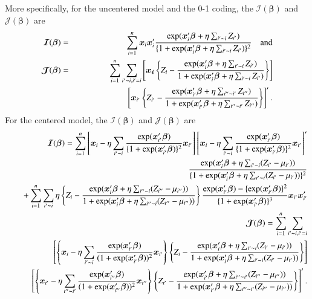 \documentclass[authoryear,review, 12pt]{elsarticle}
\begin{document}
More specifically, for the uncentered model and the 0-1 coding, the $\bm{\mathcal{I}}(\bm{\beta})$ and $\bm{\mathcal{J}}(\bm{\beta})$ are
\begin{eqnarray*}
\bm{\mathcal{I}}(\bm{\beta})&=&\sum_{i=1}^n\bm{x}_i\bm{x}_i'\frac{\exp({\bm{x}_i'\bm{\beta}+\eta\sum_{i'\thicksim i}Z_{i'}})}{\{1+\exp(\bm{x}_i'\bm{\beta}+\eta\sum_{i'\thicksim i}Z_{i'})\}^2}\quad\mbox{and} \\
\bm{\mathcal{J}}(\bm{\beta})&=&\sum_{i=1}^n\sum_{i'\thicksim i, i'=i}\left[\bm{x_i}\left\{Z_i-\frac{\exp(\bm{x}_i'\bm{\beta}+\eta\sum_{i'\thicksim i}Z_{i'})}{1+\exp(\bm{x}_i'\bm{\beta}+\eta\sum_{i'\thicksim i}Z_{i'})}\right\}\right]\\ 
&&\quad\quad\quad\quad\quad\quad\left[\bm{x}_{i'}\left\{Z_{i'}-\frac{\exp({\bm{x}_{i'}'\bm{\beta}+\eta\sum_{i''\thicksim i'}Z_{i''}})}{1+\exp(\bm{x}_{i'}'\bm{\beta}+\eta\sum_{i''\thicksim i'}Z_{i''})}\right\}\right]'.
\end{eqnarray*}
For the centered model, the $\bm{\mathcal{I}}(\bm{\beta})$ and $\bm{\mathcal{J}}(\bm{\beta})$ are
\begin{eqnarray*}
&&\bm{\mathcal{I}}(\bm{\beta})=\sum_{i=1}^n \left[ \bm{x}_i-\eta \sum_{i' \thicksim i} \frac{\exp(\bm{x}_{i'}'\bm{\beta})}{\{1+\exp(\bm{x}_{i'}'\bm{\beta})\}^2}\bm{x}_{i'}\right]\left[ \bm{x}_i-\eta \sum_{i' \thicksim i} \frac{\exp(\bm{x}_{i'}'\bm{\beta})}{\{1+\exp(\bm{x}_{i'}'\bm{\beta})\}^2}\bm{x}_{i'}\right]'\\ 
&&\quad\quad\quad\quad\quad\quad\frac{\exp({\bm{x}_i'\bm{\beta}+\eta\sum_{i' \thicksim i}(Z_{i'}-\mu_{i'})})} {\{1+\exp(\bm{x}_i'\bm{\beta}+\eta\sum_{i' \thicksim i}(Z_{i'}-\mu_{i'}))\}^2}\\
&&+\sum_{i=1}^n \sum_{ i' \thicksim i} \eta \left\{Z_i-\frac{\exp({\bm{x}_i'\bm{\beta}+\eta\sum_{i'' \thicksim i}(Z_{i''}-\mu_{i''})})}{1+\exp(\bm{x}_i'\bm{\beta}+\eta\sum_{i'' \thicksim i}(Z_{i''}-\mu_{i''}))}\right\}\frac{\exp(\bm{x}_{i'}'\bm{\beta})-\{\exp(\bm{x}_{i'}'\bm{\beta})\}^2}{\{1+\exp(\bm{x}_{i'}'\bm{\beta})\}^3}\bm{x}_{i'}\bm{x}_{i'}'
\\
&&\bm{\mathcal{J}}(\bm{\beta})=\sum_{i=1}^n\sum_{i' \thicksim i, i'=i}\\
&&\left[ \left\{ \bm{x}_i-\eta \sum_{i' \thicksim i} \frac{\exp(\bm{x}_{i'}'\bm{\beta})}{(1+\exp(\bm{x}_{i'}'\bm{\beta}))^2}\bm{x}_{i'} \right\} \left\{Z_i-\frac{\exp({\bm{x}_i'\bm{\beta}+\eta\sum_{i' \thicksim i}(Z_{i'}-\mu_{i'})})}{1+\exp(\bm{x}_i'\bm{\beta}+\eta\sum_{i' \thicksim i}(Z_{i'}-\mu_{i'}))}\right\}\right]\\ 
&&\quad\quad\left[ \left\{ \bm{x}_{i'}-\eta \sum_{i'' \thicksim {i'}} \frac{\exp(\bm{x}_{i''}'\bm{\beta})}{(1+\exp(\bm{x}_{i''}'\bm{\beta}))^2}\bm{x}_{i''} \right\} \left\{Z_{i'}-\frac{\exp({\bm{x}_{i'}'\bm{\beta}+\eta\sum_{i'' \thicksim {i'}}(Z_{i''}-\mu_{i''})})}{1+\exp(\bm{x}_{i'}'\bm{\beta}+\eta\sum_{i'' \thicksim {i'}}(Z_{i''}-\mu_{i''}))}\right\}\right]'.
\end{eqnarray*}
\end{document}
